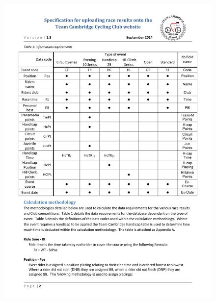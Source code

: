 \begin{figure}[H]
    \includegraphics[width=\textwidth]{./TeamCambridgeSpec/page2.pdf}
\end{figure}

